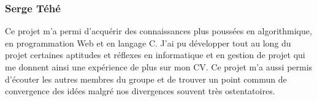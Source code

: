 \subsubsection{Serge Téhé}
Ce projet m'a permi d'acquérir des connaissances plus poussées en algorithmique, en programmation Web et en langage C. J'ai pu développer tout au long du projet certaines aptitudes et réflexes en informatique et en gestion de projet qui me donnent ainsi une expérience de plus sur mon CV. Ce projet m'a aussi permis d'écouter les autres membres du groupe et de trouver un point commun de convergence des idées malgré nos divergences souvent très ostentatoires.

